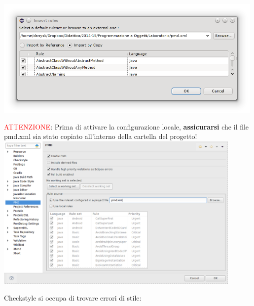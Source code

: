 \documentclass[presentation]{beamer}
\begin{document}
 {
	\centering
	\includegraphics[width=0.99\textwidth]{img/pmdimport}
}

 {
	\textcolor{red}{ATTENZIONE}: Prima di attivare la configurazione locale, \textbf{assicurarsi} che il file pmd.xml sia stato copiato all'interno della cartella del progetto!
	\centering
	\includegraphics[width=0.9\textwidth]{img/pmdproj}
}

 {
	 {
		Checkstyle si occupa di trovare errori di stile:
	}
}
\end{document}
